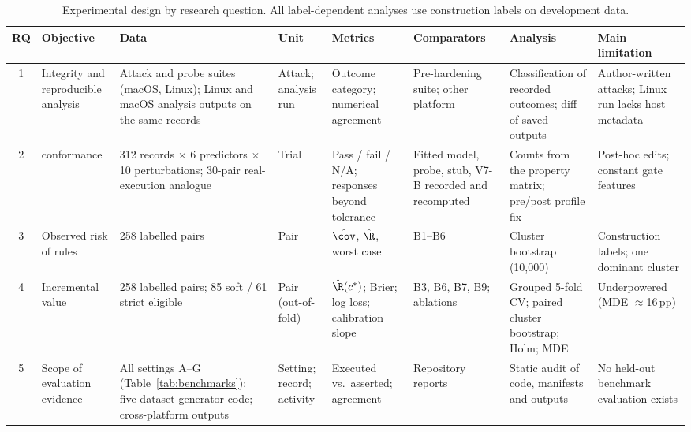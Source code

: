 \begin{table}[!t]
\caption{Experimental design by research question. All label-dependent analyses use construction labels on development data.}
\label{tab:design}
\centering
\scriptsize
\setlength{\tabcolsep}{2.8pt}
\begin{tabular}{|c|L{2.3cm}|L{2.5cm}|L{1.5cm}|L{2.4cm}|L{2.2cm}|L{2.6cm}|L{1.9cm}|}
\hline
RQ & Objective & Data & Unit & Metrics & Comparators & Analysis & Main limitation \\
 & Integrity and reproducible analysis & Attack and probe suites (macOS, Linux); Linux and macOS analysis outputs on the same records & Attack; analysis run & Outcome category; numerical agreement & Pre-hardening suite; other platform & Classification of recorded outcomes; diff of saved outputs & Author-written attacks; Linux run lacks host metadata \\
2 & \ers{} conformance & 312 records $\times$ 6 predictors $\times$ 10 perturbations; 30-pair real-execution analogue & Trial & Pass / fail / N/A; responses beyond tolerance & Fitted model, probe, stub, V7-B recorded and recomputed & Counts from the property matrix; pre/post profile fix & Post-hoc edits; constant gate features \\
3 & Observed risk of rules & 258 labelled pairs & Pair & $\hat\cov$, $\hat\R$, worst case & B1--B6 & Cluster bootstrap (10,000) & Construction labels; one dominant cluster \\
4 & Incremental value & 258 labelled pairs; 85 soft / 61 strict eligible & Pair (out-of-fold) & $\hat\R(c^\ast)$; Brier; log loss; calibration slope & B3, B6, B7, B9; ablations & Grouped 5-fold CV; paired cluster bootstrap; Holm; MDE & Underpowered (MDE $\approx$16\,pp) \\
5 & Scope of evaluation evidence & All settings A--G (Table~\ref{tab:benchmarks}); five-dataset generator code; cross-platform outputs & Setting; record; activity & Executed vs.\ asserted; agreement & Repository reports & Static audit of code, manifests and outputs & No held-out benchmark evaluation exists \\
\hline
\end{tabular}
\end{table}

